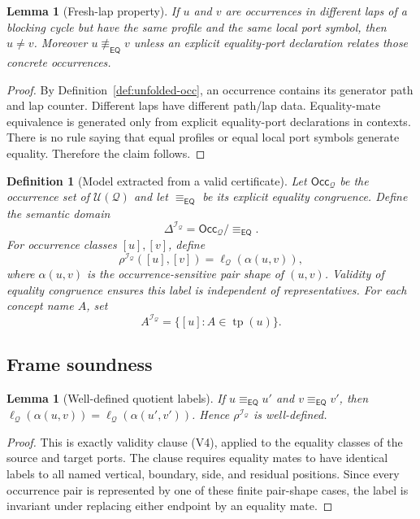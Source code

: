 \documentclass[11pt]{article}
\newtheorem{lemma}[theorem]{Lemma}
\newtheorem{definition}[theorem]{Definition}
\newcommand{\EQ}{\mathsf{EQ}}
\newcommand{\I}{\mathcal I}
\newcommand{\Q}{\mathcal Q}
\newcommand{\U}{\mathcal U}
\newcommand{\Occ}{\mathsf{Occ}}
\newcommand{\typ}{\operatorname{tp}}
\newcommand{\eqc}{\equiv_{\EQ}}
\begin{document}
\begin{lemma}[Fresh-lap property]\label{lem:fresh-lap}
If $u$ and $v$ are occurrences in different laps of a blocking cycle but have the same profile and the same local port symbol, then $u\ne v$.  Moreover $u\not\eqc v$ unless an explicit equality-port declaration relates those concrete occurrences.
\end{lemma}

\begin{proof}
By Definition~\ref{def:unfolded-occ}, an occurrence contains its generator path and lap counter.  Different laps have different path/lap data.  Equality-mate equivalence is generated only from explicit equality-port declarations in contexts.  There is no rule saying that equal profiles or equal local port symbols generate equality.  Therefore the claim follows.
\end{proof}

\begin{definition}[Model extracted from a valid certificate]\label{def:model-from-cert}
Let $\Occ_\Q$ be the occurrence set of $\U(\Q)$ and let $\eqc$ be its explicit equality congruence.  Define the semantic domain
\[
   \Delta^{\I_\Q}=\Occ_\Q/{\eqc}.
\]
For occurrence classes $[u],[v]$, define
\[
   \rho^{\I_\Q}([u],[v])=\ell_\Q(\alpha(u,v)),
\]
where $\alpha(u,v)$ is the occurrence-sensitive pair shape of $(u,v)$.  Validity of equality congruence ensures this label is independent of representatives.  For each concept name $A$, set
\[
   A^{\I_\Q}=\{[u]:A\in\typ(u)\}.
\]
\end{definition}

\subsection{Frame soundness}

\begin{lemma}[Well-defined quotient labels]\label{lem:well-defined-labels}
If $u\eqc u'$ and $v\eqc v'$, then $\ell_\Q(\alpha(u,v))=\ell_\Q(\alpha(u',v'))$.  Hence $\rho^{\I_\Q}$ is well-defined.
\end{lemma}

\begin{proof}
This is exactly validity clause (V4), applied to the equality classes of the source and target ports.  The clause requires equality mates to have identical labels to all named vertical, boundary, side, and residual positions.  Since every occurrence pair is represented by one of these finite pair-shape cases, the label is invariant under replacing either endpoint by an equality mate.
\end{proof}
\end{document}

